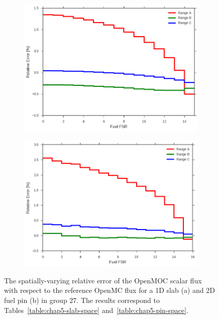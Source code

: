 \begin{figure}[H]
\begin{subfigure}{.9\textwidth}
  \centering
  \includegraphics[width=\linewidth]{figures/biases/slab/rel-err-fuel-fsrs}
  \caption{}
\end{subfigure}
\begin{subfigure}{.9\textwidth}
  \centering
  \includegraphics[width=\linewidth]{figures/biases/pin-cell/rel-err-fuel-fsrs}
  \caption{}
\end{subfigure}
\caption[Flux relative error by FSR]{The spatially-varying relative error of the OpenMOC scalar flux with respect to the reference OpenMC flux for a 1D slab (a) and 2D fuel pin (b) in group 27. The results correspond to Tables~\ref{table:chap5-slab-space} and~\ref{table:chap5-pin-space}.}
\label{fig:chap5-rel-err-space}
\end{figure}

